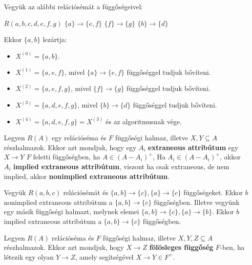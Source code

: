 \begin{pld}
Vegyük az alábbi relációsémát a függőségeivel:
\begin{center}
    $R(a,b,c,d,e,f,g)$ \break
    $\{a\} \longrightarrow \{e,f\}$\break
    $\{f\} \longrightarrow \{g\}$\break
    $\{b\} \longrightarrow \{d\}$  
\end{center}
Ekkor $\{a,b\}$ lezártja:
\begin{itemize}
    \item $X^{(0)} = \{a,b\}.$
    \item $X^{(1)} = \{a,e,f\}$, mivel $\{a\} \longrightarrow \{e,f\}$ függőséggel tudjuk bővíteni.
    \item $X^{(2)} = \{a,e,f,g\}$, mivel $\{f\} \longrightarrow \{g\}$ függőséggel tudjuk bővíteni.
    \item $X^{(3)} = \{a,d,e,f,g\}$, mivel $\{b\} \longrightarrow \{d\}$ függőséggel tudjuk bővíteni.
    \item $X^{(4)} = \{a,d,e,f,g\} = X^{(3)}$ és az algoritmusnak vége.
\end{itemize}
\end{pld}

\begin{defi}
Legyen $R(A)$ egy relációséma és $F$ függőségi halmaz, illetve $X,Y \subseteq A$ részhalmazok. Ekkor azt mondjuk, hogy egy $A_i$ \textbf{extraneous attribútum} egy $X \longrightarrow Y$ $F$ feletti függőségben, ha $A \in (A-A_i)^+$, Ha $A_i \in (A-A_i)^+$, akkor $A_i$ \textbf{implied extraneous attribútum}, viszont ha csak extraneous, de nem implied, akkor \textbf{nonimplied extraneous attribútum}.
\end{defi}

\begin{pld}
Vegyük $R(a,b,c)$ relációsémát és $\{a,b\} \longrightarrow \{c\}, \{a\} \longrightarrow \{c\}$ függőségeket. Ekkor $b$ nonimplied extraneous attribútum a $\{a,b\} \longrightarrow \{c\}$ függőségben. \hfill \break
Illetve vegyünk egy másik függőségi halmazt, melynek elemei $\{a,b\} \longrightarrow \{c\}, \{a\} \longrightarrow \{b\}$. Ekkor $b$ implied extraneous attribútum a $\{a,b\} \longrightarrow \{c\}$ függőségben.
\end{pld}

\begin{defi}
Legyen $R(A)$ relációséma és $F$ függőségi halmaz, illetve $X,Y,Z \subseteq A$ részhalmazok. Ekkor azt mondjuk, hogy $X \longrightarrow Z$ \textbf{fölösleges függőség} $F$-ben, ha létezik egy olyan $Y \longrightarrow Z$, amely segítségével $X \longrightarrow Y \in F^+$.
\end{defi}

